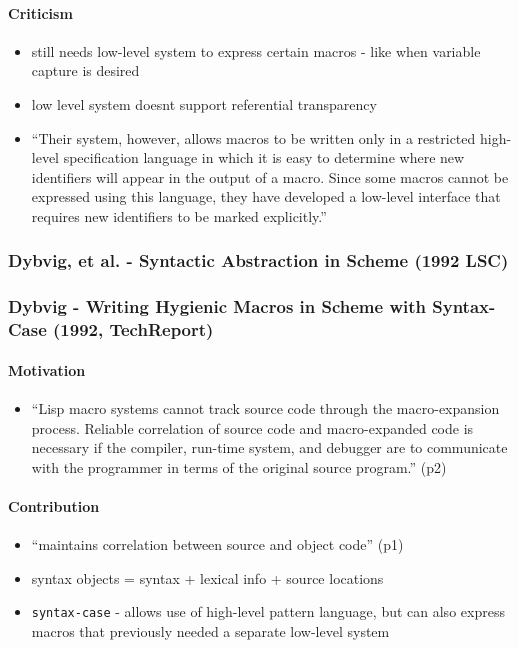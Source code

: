 \documentclass[12pt]{article}	%
\begin{document}
\paragraph{Criticism}
\begin{itemize}
	\item still needs low-level system to express certain macros - like when variable capture is desired
	\item low level system doesnt support referential transparency~\cite[p299]{Dybvig1992Syntactic}
	\item ``Their system, however, allows macros to be written only in a restricted high-level specification language in which it is easy to determine where new identifiers will appear in the output of a macro. Since some macros cannot be expressed using this language, they have developed a low-level interface that requires new identifiers to be marked explicitly.''~\cite[p298-299]{Dybvig1992Syntactic}
\end{itemize}


\subsubsection*{Dybvig, et al. - Syntactic Abstraction in Scheme (1992 LSC)}
\subsubsection*{Dybvig - Writing Hygienic Macros in Scheme with Syntax-Case (1992, TechReport)}
\paragraph{Motivation}
\begin{itemize}
	\item ``Lisp macro systems cannot track source code through the macro-expansion process. Reliable correlation of source code and macro-expanded code is necessary if the compiler, run-time system, and debugger are to communicate with the programmer in terms of the original source program.'' (p2)
\end{itemize}
\paragraph{Contribution}
\begin{itemize}
	\item ``maintains correlation between source and object code'' (p1)
	\item syntax objects = syntax + lexical info + source locations
	\item \verb!syntax-case! - allows use of high-level pattern language, but can also express macros that previously needed a separate low-level system
\end{itemize}
\end{document}

